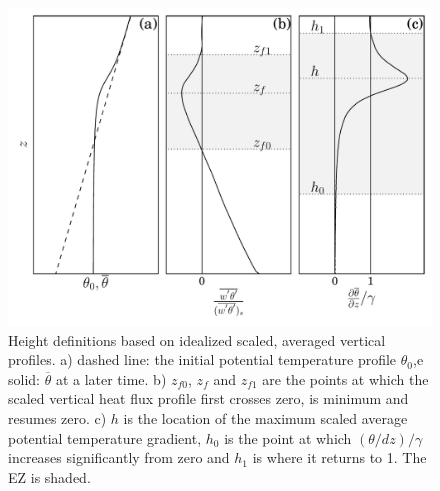 \documentclass[referee]{svjour3}
\begin{document}
\begin{figure}[htbp]
    \centering
    
    \includegraphics[scale=.5]{figures/height_defs.pdf}
    \caption[label a, b c Height Definitions]{Height definitions based on idealized scaled, averaged vertical profiles. a) dashed line: the initial potential temperature profile $\theta_0$,e solid: $\overline{\theta}$ at a later time. b)  $z_{f0}$, $z_{f}$ and $z_{f1}$ are the points at which the scaled vertical heat flux profile first crosses zero, is minimum and resumes zero. 
c)  $h$ is the location of the maximum scaled average potential temperature gradient, $h_{0}$ is the point at which $(\theta/dz)/\gamma$ increases significantly from zero and $h_{1}$ is where it returns to 1. The EZ is shaded.}
    \label{fig:hdefs} 
\end{figure}
\end{document}
